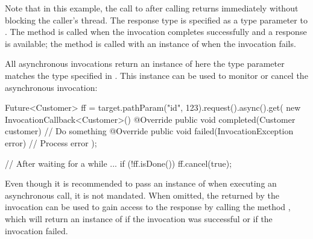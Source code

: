 Note that in this example, the call to  after calling  returns immediately without blocking the caller's thread.
The response type is specified as a type parameter to . The method  is called when the invocation completes successfully and a response is available; the method  is called with an instance of  when the invocation fails.

All asynchronous invocations return an instance of  here the type parameter  matches the type specified in . This instance can be used to monitor or cancel the asynchronous invocation:

\begin{listing}{1}
Future<Customer> ff = target.pathParam("id", 123).request().async().get(
    new InvocationCallback<Customer>() {
        @Override
        public void completed(Customer customer) {
            // Do something
        }
        @Override
        public void failed(InvocationException error) {
            // Process error
        }
    });

// After waiting for a while ...
if (!ff.isDone()) {
    ff.cancel(true);
} 
\end{listing}

Even though it is recommended to pass an instance of  when executing an asynchronous call, it is not mandated. When omitted, the  returned by the invocation can be used to gain access to the response by calling the method , which will return an instance of  if the invocation was successful or  if the invocation failed.






